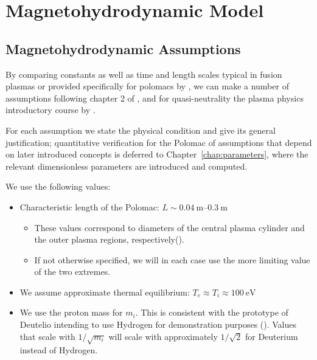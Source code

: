 \section{Magnetohydrodynamic Model}
\subsection{Magnetohydrodynamic Assumptions}
\label{subsec:mhd_assumptions}
By comparing constants as well as time and length scales typical in fusion
plasmas or provided specifically for polomacs by \cite{Elio2024}, 
we can make a number of assumptions following chapter 2 of \cite{Freidberg2014},
and for quasi-neutrality the plasma physics introductory course by \cite{epfl_plasma_intro}.


For each assumption we state the physical condition
and give its general justification; quantitative verification for the Polomac of assumptions
that depend on later introduced concepts is deferred to Chapter~\ref{chap:parameters},
where the relevant dimensionless parameters are introduced and computed.

We use the following values:
\begin{itemize}
    \item Characteristic length of the Polomac: $L \sim \SIrange{0.04}{0.3}{\meter}$ 
    \begin{itemize}
        \item These values correspond to diameters of the central plasma cylinder and the outer plasma regions, respectively(\cite{Elio2024}).
        \item If not otherwise specified, we will in each case use the more limiting value of the two extremes.
    \end{itemize}
    \item We assume approximate thermal equilibrium: $T_e \approx T_i \approx \SI{100}{\electronvolt}$
    \item We use the proton mass for $m_i$. This is consistent with the prototype of Deutelio intending to use Hydrogen for demonstration purposes (\cite{Elio2024}).
            Values that scale with $1/\sqrt{m_i}$ will scale with approximately $1/\sqrt{2}$ for Deuterium instead of Hydrogen. 
\end{itemize}


